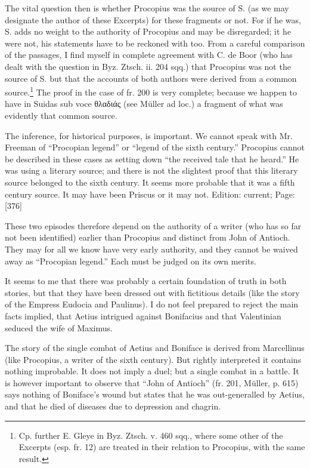 The vital question then is whether Procopius was the source of S. (as we may designate the author of these Excerpts) for these fragments or not. For if he was, S. adds no weight to the authority of Procopius and may be disregarded; it he were not, his statements have to be reckoned with too. From a careful comparison of the passages, I find myself in complete agreement with C. de Boor (who has dealt with the question in Byz. Ztsch. ii. 204 sqq.) that Procopius was not the source of S. but that the accounts of both authors were derived from a common source.\footnote{Cp. further E. Gleye in Byz. Ztsch. v. 460 sqq., where some other of the Excerpts (esp. fr. 12) are treated in their relation to Procopius, with the same result.} The proof in the case of fr. 200 is very complete; because we happen to have in Suidas sub voce \textgreek{θλαδιάς} (see Müller ad loc.) a fragment of what was evidently that common source.

The inference, for historical purposes, is important. We cannot speak with Mr. Freeman of \texthebrew{“}Procopian legend\texthebrew{}” or \texthebrew{“}legend of the sixth century.\texthebrew{}” Procopius cannot be described in these cases as setting down \texthebrew{“}the received tale that he heard.\texthebrew{}” He was using a literary source; and there is not the slightest proof that this literary source belonged to the sixth century. It seems more probable that it was a fifth century source. It may have been Priscus or it may not.
Edition: current; Page: [376]

These two episodes therefore depend on the authority of a writer (who has so far not been identified) earlier than Procopius and distinct from John of Antioch. They may for all we know have very early authority, and they cannot be waived away as \texthebrew{“}Procopian legend.\texthebrew{}” Each must be judged on its own merits.

It seems to me that there was probably a certain foundation of truth in both stories, but that they have been dressed out with fictitious details (like the story of the Empress Eudocia and Paulinus). I do not feel prepared to reject the main facts implied, that Aetius intrigued against Bonifacius and that Valentinian seduced the wife of Maximus.

The story of the single combat of Aetius and Boniface is derived from Marcellinus (like Procopius, a writer of the sixth century). But rightly interpreted it contains nothing improbable. It does not imply a duel; but a single combat in a battle. It is however important to observe that \texthebrew{“}John of Antioch\texthebrew{}” (fr. 201, Müller, p. 615) says nothing of Boniface\texthebrew{}’s wound but states that he was out-generalled by Aetius, and that he died of diseases due to depression and chagrin.

